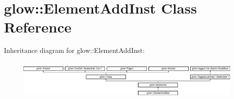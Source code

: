 \hypertarget{classglow_1_1_element_add_inst}{}\section{glow\+:\+:Element\+Add\+Inst Class Reference}
\label{classglow_1_1_element_add_inst}
Inheritance diagram for glow\+:\+:Element\+Add\+Inst\+:\begin{figure}[H]
\begin{center}
\leavevmode
\includegraphics[height=1.991111cm]{classglow_1_1_element_add_inst}
\end{center}
\end{figure}
